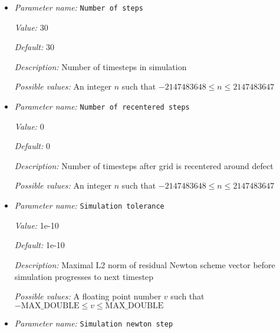 \begin{itemize}
{\it Value:} 1.0


{\it Default:} 1.0


{\it Description:} Discrete timestep length


{\it Possible values:} A floating point number $v$ such that $-\text{MAX\_DOUBLE} \leq v \leq \text{MAX\_DOUBLE}$
\item {\it Parameter name:} {\tt Number of steps}
\label{parameters:NematicSystemMPIDriver/Simulation/Number of steps}
\label{parameters:NematicSystemMPIDriver/Simulation/Number_20of_20steps}


{\it Value:} 30


{\it Default:} 30


{\it Description:} Number of timesteps in simulation


{\it Possible values:} An integer $n$ such that $-2147483648\leq n \leq 2147483647$
\item {\it Parameter name:} {\tt Number of recentered steps}
\label{parameters:NematicSystemMPIDriver/Simulation/Number of recentered steps}
\label{parameters:NematicSystemMPIDriver/Simulation/Number_20of_20recentered_20steps}


{\it Value:} 0


{\it Default:} 0


{\it Description:} Number of timesteps after grid is recentered around defect


{\it Possible values:} An integer $n$ such that $-2147483648\leq n \leq 2147483647$
\item {\it Parameter name:} {\tt Simulation tolerance}
\label{parameters:NematicSystemMPIDriver/Simulation/Simulation tolerance}
\label{parameters:NematicSystemMPIDriver/Simulation/Simulation_20tolerance}


{\it Value:} 1e-10


{\it Default:} 1e-10


{\it Description:} Maximal L2 norm of residual Newton scheme vector before simulation progresses to next timestep


{\it Possible values:} A floating point number $v$ such that $-\text{MAX\_DOUBLE} \leq v \leq \text{MAX\_DOUBLE}$
\item {\it Parameter name:} {\tt Simulation newton step}
\label{parameters:NematicSystemMPIDriver/Simulation/Simulation newton step}
\label{parameters:NematicSystemMPIDriver/Simulation/Simulation_20newton_20step}



\end{itemize}
